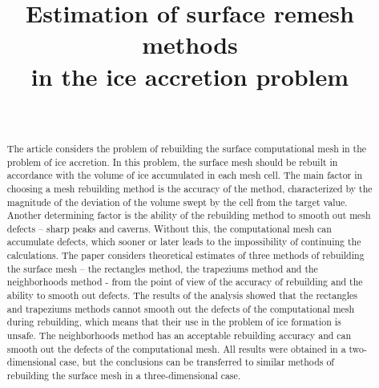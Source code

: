 \documentclass[
11pt,%
tightenlines,%
twoside,%
onecolumn,%
nofloats,%
nobibnotes,%
nofootinbib,%
superscriptaddress,%
noshowpacs,%
centertags]%
{revtex4}
\begin{document}

\title{Estimation of surface remesh methods \\ in the ice accretion problem}

\author{~}




\begin{abstract} %
The article considers the problem of rebuilding the surface computational mesh in the problem of ice accretion.
In this problem, the surface mesh should be rebuilt in accordance with the volume of ice accumulated in each mesh cell.
The main factor in choosing a mesh rebuilding method is the accuracy of the method, characterized by the magnitude of the deviation of the volume swept by the cell from the target value.
Another determining factor is the ability of the rebuilding method to smooth out mesh defects -- sharp peaks and caverns.
Without this, the computational mesh can accumulate defects, which sooner or later leads to the impossibility of continuing the calculations.
The paper considers theoretical estimates of three methods of rebuilding the surface mesh -- the rectangles method, the trapeziums method and the neighborhoods method - from the point of view of the accuracy of rebuilding and the ability to smooth out defects.
The results of the analysis showed that the rectangles and trapeziums methods cannot smooth out the defects of the computational mesh during rebuilding, which means that their use in the problem of ice formation is unsafe.
The neighborhoods method has an acceptable rebuilding accuracy and can smooth out the defects of the computational mesh. All results were obtained in a two-dimensional case, but the conclusions can be transferred to similar methods of rebuilding the surface mesh in a three-dimensional case.\end{abstract}
\end{document}
